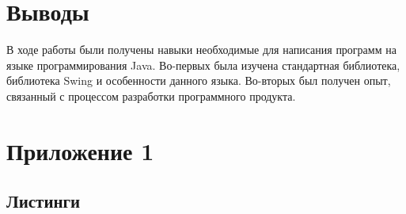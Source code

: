 \section{Выводы}

В ходе работы были получены навыки необходимые для написания программ на языке программирования Java. Во-первых была изучена стандартная библиотека, библиотека Swing и особенности данного языка. Во-вторых был получен опыт, связанный с процессом разработки программного продукта. 

\section{Приложение 1}

\subsection{Листинги}



